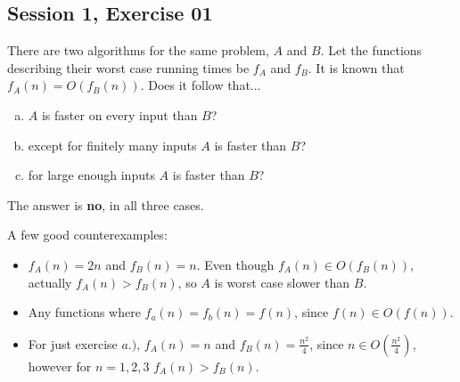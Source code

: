 \subsection{Session 1, Exercise 01}


There are two algorithms for the same problem, $A$ and $B$. Let the functions describing their worst case running times be $f_A$ and $f_B$. It is known that $f_A(n) = O(f_B(n))$. Does it follow that...

\begin{enumerate}[a.)]
\item $A$ is faster on every input than $B$?
\item except for finitely many inputs $A$ is faster than $B$?
\item for large enough inputs $A$ is faster than $B$?
\end{enumerate}


The answer is \textbf{no}, in all three cases.

A few good counterexamples:
\begin{itemize}
    \item $f_A(n) = 2n$ and $f_B(n)=n$. Even though $f_A(n)\in{}O(f_B(n))$, actually $f_A(n) > f_B(n)$, so $A$ is worst case slower than $B$.
    \item Any functions where $f_a(n) = f_b(n) = f(n)$, since $f(n)\in{}O(f(n))$.
    \item For just exercise $a.)$, $f_A(n) = n$ and $f_B(n)=\frac{n^2}{4}$, since $n\in{}O(\frac{n^2}{4})$, however for $n=1,2,3$ $f_A(n)>f_B(n)$.
\end{itemize}


